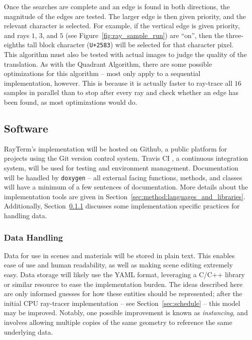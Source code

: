 \documentclass[11pt]{article}
\newcommand{\name}{{\sc RayTerm}}
\begin{document}
Once the searches are complete and an edge is found in both directions, the magnitude of the edges are tested.
The larger edge is then given priority, and the relevant character is selected.
For example, if the vertical edge is given priority, and rays $1$, $3$, and $5$ (see Figure~\ref{fig:ray_sample_run}) are ``on'', then the three-eighths tall block character (\texttt{U+2583}) will be selected for that character pixel.
This algorithm must also be tested with actual images to judge the quality of the translation.
As with the Quadrant Algorithm, there are some possible optimizations for this algorithm -- most only apply to a sequential implementation, however.
This is because it is actually faster to ray-trace all $16$ samples in parallel than to stop after every ray and check whether an edge has been found, as most optimizations would do.

\subsection{Software}
\label{sec:method:software}

\name's implementation will be hosted on Github, a public platform for projects using the Git version control system.
Travis CI \cite{travisci}, a continuous integration system, will be used for testing and environment management.
Documentation will be handled by \texttt{doxygen} \cite{van2008doxygen} -- all external facing functions, methods, and classes will have a minimum of a few sentences of documentation.
More details about the implementation tools are given in Section~\ref{sec:method:languages_and_libraries}.
Additionally, Section~\ref{sec:method:data_handling} discusses some implementation specific practices for handling data.

\subsubsection{Data Handling}
\label{sec:method:data_handling}

Data for use in scenes and materials will be stored in plain text.
This enables ease of use and human readability, as well as making scene editing extremely easy.
Data storage will likely use the YAML format, leveraging a C/C++ library or similar resource to ease the implementation burden.
The ideas described here are only informed guesses for how these entities should be represented; after the initial CPU ray-tracer implementation -- see Section~\ref{sec:schedule} -- this model may be improved.
Notably, one possible improvement is known as {\it instancing}, and involves allowing multiple copies of the same geometry to reference the same underlying data.
\end{document}
